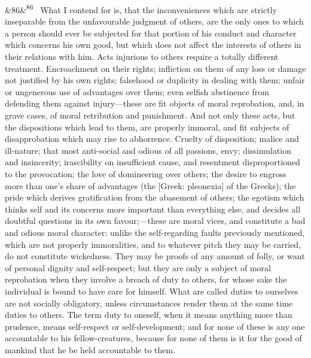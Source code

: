 \documentclass[12pt]{article}
\newcommand{\para}[1][]{\par\noindent\ifx&#1&\else\textsuperscript{\footnotesize #1}~\fi}
\begin{document}
\para[86] What I contend for is, that the inconveniences which are strictly inseparable from the unfavourable judgment of others, are the only ones to which a person should ever be subjected for that portion of his conduct and character which concerns his own good, but which does not affect the interests of others in their relations with him. Acts injurious to others require a totally different treatment. Encroachment on their rights; infliction on them of any loss or damage not justified by his own rights; falsehood or duplicity in dealing with them; unfair or ungenerous use of advantages over them; even selfish abstinence from defending them against injury---these are fit objects of moral reprobation, and, in grave cases, of moral retribution and punishment. And not only these acts, but the dispositions which lead to them, are properly immoral, and fit subjects of disapprobation which may rise to abhorrence. Cruelty of disposition; malice and ill-nature; that most anti-social and odious of all passions, envy; dissimulation and insincerity; irascibility on insufficient cause, and resentment disproportioned to the provocation; the love of domineering over others; the desire to engross more than one's share of advantages (the [Greek: pleonexia] of the Greeks); the pride which derives gratification from the abasement of others; the egotism which thinks self and its concerns more important than everything else, and decides all doubtful questions in its own favour;---these are moral vices, and constitute a bad and odious moral character: unlike the self-regarding faults previously mentioned, which are not properly immoralities, and to whatever pitch they may be carried, do not constitute wickedness. They may be proofs of any amount of folly, or want of personal dignity and self-respect; but they are only a subject of moral reprobation when they involve a breach of duty to others, for whose sake the individual is bound to have care for himself. What are called duties to ourselves are not socially obligatory, unless circumstances render them at the same time duties to others. The term duty to oneself, when it means anything more than prudence, means self-respect or self-development; and for none of these is any one accountable to his fellow-creatures, because for none of them is it for the good of mankind that he be held accountable to them.
\end{document}
